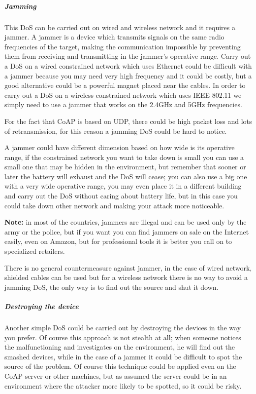 	\subparagraph{Jamming}
	This DoS can be carried out on wired and wireless network and it requires a jammer.\newline
	A jammer is a device which transmits signals on the same radio frequencies of the target, making the communication impossible by preventing them from receiving and transmitting in the jammer’s operative range.\newline
	Carry out a DoS on a wired constrained network which uses Ethernet could be difficult with a jammer because you may need very high frequency and it could be costly, but a good alternative could be a powerful magnet placed near the cables.\newline
	In order to carry out a DoS on a wireless constrained network which uses IEEE 802.11 we simply need to use a jammer that works on the 2.4GHz and 5GHz frequencies.\newline
	
	For the fact that CoAP is based on UDP, there could be high packet loss and lots of retransmission, for this reason a jamming DoS could be hard to notice.\newline
	
	A jammer could have different dimension based on how wide is its operative range, if the constrained network you want to take down is small you can use a small one that may be hidden in the environment, but remember that sooner or later the battery will exhaust and the DoS will cease; you can also use a big one with a very wide operative range, you may even place it in a different building and carry out the DoS without caring about battery life, but in this case you could take down other network and making your attack more noticeable.\newline
	
	\textbf{Note:} in most of the countries, jammers are illegal and can be used only by the army or the police, but if you want you can find jammers on sale on the Internet easily, even on Amazon, but for professional tools it is better you call on to specialized retailers.\newline
	
	There is no general countermeasure against jammer, in the case of wired network, shielded cables can be used but for a wireless network there is no way to avoid a jamming DoS, the only way is to find out the source and shut it down.\newline
	
	\subparagraph{Destroying the device}
	Another simple DoS could be carried out by destroying the devices in the way you prefer.\newline
	Of course this approach is not stealth at all; when someone notices the malfunctioning and investigates on the environment, he will find out the smashed devices, while in the case of a jammer it could be difficult to spot the source of the problem.\newline
	Of course this technique could be applied even on the CoAP server or other machines, but as assumed the server could be in an environment where the attacker more likely to be spotted, so it could be risky.\newline
	

